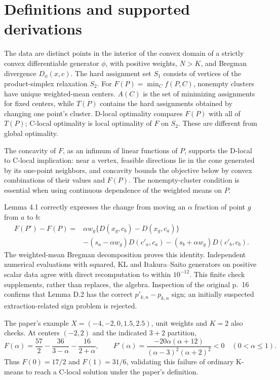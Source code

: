 \documentclass[10pt]{article}
\begin{document}
\section*{Definitions and supported derivations}
The data are distinct points in the interior of the convex domain of a strictly convex differentiable generator \(\phi\), with positive weights, \(N>K\), and Bregman divergence \(D_\phi(x,c)\). The hard assignment set \(S_1\) consists of vertices of the product-simplex relaxation \(S_2\). For \(F(P)=\min_C f(P,C)\), nonempty clusters have unique weighted-mean centers. \(A(C)\) is the set of minimizing assignments for fixed centers, while \(T(P)\) contains the hard assignments obtained by changing one point’s cluster. D-local optimality compares \(F(P)\) with all of \(T(P)\); C-local optimality is local optimality of \(F\) on \(S_2\). These are different from global optimality.\par
The concavity of \(F\), as an infimum of linear functions of \(P\), supports the D-local to C-local implication: near a vertex, feasible directions lie in the cone generated by its one-point neighbors, and concavity bounds the objective below by convex combinations of their values and \(F(P)\). The nonempty-cluster condition is essential when using continuous dependence of the weighted means on \(P\).\par
Lemma 4.1 correctly expresses the change from moving an \(\alpha\) fraction of point \(g\) from \(a\) to \(b\): \[\begin{aligned}
 F(P')-F(P)={}&\alpha w_g\{D(x_g,c_b)-D(x_g,c_a)\}\\
 &-(s_a-\alpha w_g)D(c'_a,c_a)-(s_b+\alpha w_g)D(c'_b,c_b).\end{aligned}\] The weighted-mean Bregman decomposition proves this identity. Independent numerical evaluations with squared, KL and Itakura–Saito generators on positive scalar data agree with direct recomputation to within \(10^{-12}\). This finite check supplements, rather than replaces, the algebra. Inspection of the original p. 16 confirms that Lemma D.2 has the correct \(p'_{k,n}-p_{k,n}\) sign; an initially suspected extraction-related sign problem is rejected.\par
The paper’s example \(X=(-4,-2,0,1.5,2.5)\), unit weights and \(K=2\) also checks. At centers \((-2,2)\) and the indicated \(3+2\) partition, \[F(\alpha)=\frac{57}{2}-\frac{36}{3-\alpha}-\frac{16}{2+\alpha},\qquad
 F'(\alpha)=\frac{-20\alpha(\alpha+12)}{(\alpha-3)^2(\alpha+2)^2}<0
 \quad(0<\alpha\leq1).\] Thus \(F(0)=17/2\) and \(F(1)=31/6\), validating this failure of ordinary K-means to reach a C-local solution under the paper’s definition.\par
\end{document}
